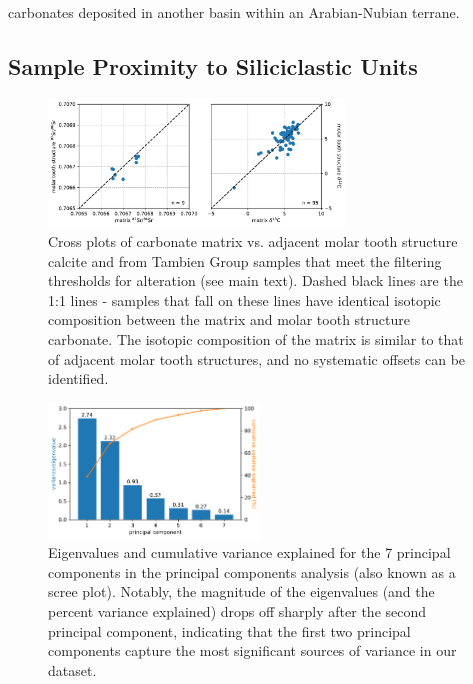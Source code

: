 carbonates deposited in another basin within an Arabian-Nubian terrane.

\clearpage

\subsection{Sample Proximity to Siliciclastic Units}

\begin{figure}[h!]
\begin{center}
	\includegraphics[width=0.7\textwidth]{figures/Tambien/MTS-MTX-comparison.pdf}
	\caption{Cross plots of carbonate matrix vs. adjacent molar tooth structure calcite \SrSr and \dC from Tambien Group samples that meet the filtering thresholds for alteration (see main text). Dashed black lines are the 1:1 lines - samples that fall on these lines have identical isotopic composition between the matrix and molar tooth structure carbonate. The isotopic composition of the matrix is similar to that of adjacent molar tooth structures, and no systematic offsets can be identified.}
	\label{fig:MTS-MTX-comparison}
\end{center}
\end{figure}

\begin{figure}[h!]
\begin{center}
	\includegraphics[width=0.5\textwidth]{figures/Tambien/siliciclastic-filtering-components.pdf}
	\caption{Eigenvalues and cumulative variance explained for the 7 principal components in the principal components analysis (also known as a scree plot). Notably, the magnitude of the eigenvalues (and the percent variance explained) drops off sharply after the second principal component, indicating that the first two principal components capture the most significant sources of variance in our dataset.}
	\label{fig:siliciclastic-filtering-components}
\end{center}
\end{figure}

